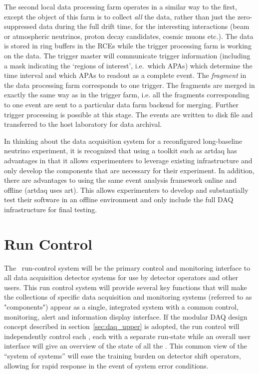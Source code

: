 The second local data processing farm operates in a similar way to the
first, except the object of this farm is to collect {\it all} the
data, rather than just the zero-suppressed data during the full drift
time, for the interesting interactions (beam or atmospheric neutrinos,
proton decay candidates, cosmic muons etc.).  The data is stored in
ring buffers in the RCEs while the trigger processing farm is working
on the data.  The trigger master will communicate trigger information
(including a mask indicating the `regions of interest', i.e.\ which
APAs) which determine the time interval and which APAs to readout as a
complete event.  The {\it fragment} in the data processing farm
corresponds to one trigger.  The fragments are merged in exactly the
same way as in the trigger farm, i.e. all the fragments corresponding
to one event are sent to a particular data farm backend for merging.
Further trigger processing is possible at this stage.  The events are
written to disk file and transferred to the host laboratory for data
archival.

In thinking about the data acquisition system for a reconfigured
long-baseline neutrino experiment, it is recognized that using a
toolkit such as artdaq has advantages in that it allows experimenters
to leverage existing infrastructure and only develop the components
that are necessary for their experiment.  In addition, there are
advantages to using the same event analysis framework online and
offline (artdaq uses art).  This allows experimenters to develop and
substantially test their software in an offline environment and only
include the full DAQ infrastructure for final testing.

\section{Run Control}
\label{sec:daq_runcontrol}

The \LBNE\ run-control system will be the primary control and
monitoring interface to all data acquisition detector systems for use
by detector operators and other users.  This run control system will
provide several key functions that will make the collections of
specific data acquisition and monitoring systems (referred to as
"components") appear as a single, integrated system with a common
control, monitoring, alert and information display interface.  If the
modular DAQ design concept described in section~\ref{sec:daq_upper} is
adopted, the run control will independently control each \COMPARTMENT,
each with a separate run-state while an overall user interface will
give an overview of the state of all the \COMPARTMENTS.  This common
view of the ``system of systems'' will ease the training burden on
detector shift operators, allowing for rapid response in the event of
system error conditions.

